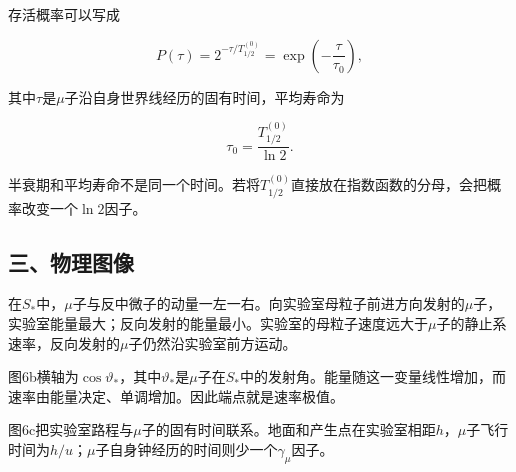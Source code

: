 \documentclass[12pt,a4paper,fontset=fandol]{ctexart}
\begin{document}
存活概率可以写成

\[
P(\tau)=2^{-\tau/T_{1/2}^{(0)}}
=\exp\left(-\frac{\tau}{\tau_0}\right),
\]

其中\(\tau\)是\(\mu\)子沿自身世界线经历的固有时间，平均寿命为

\[
\boxed{\tau_0=\frac{T_{1/2}^{(0)}}{\ln2}}.
\]

半衰期和平均寿命不是同一个时间。若将\(T_{1/2}^{(0)}\)直接放在指数函数的分母，会把概率改变一个\(\ln2\)因子。

\subsection{三、物理图像}\label{ux4e09ux7269ux7406ux56feux50cf-5}

在\(S_*\)中，\(\mu\)子与反中微子的动量一左一右。向实验室母粒子前进方向发射的\(\mu\)子，实验室能量最大；反向发射的能量最小。实验室的母粒子速度远大于\(\mu\)子的静止系速率，反向发射的\(\mu\)子仍然沿实验室前方运动。

\begin{center}
\begin{minipage}{\linewidth}
\centering\begingroup{}
\ifdim\wd\diagrambox>.88\linewidth
\sbox{\diagrambox}{\resizebox{.88\linewidth}{!}{\usebox{\diagrambox}}}\fi
\ifdim\ht\diagrambox>.38\textheight
\resizebox{!}{.38\textheight}{\usebox{\diagrambox}}
\else\usebox{\diagrambox}\fi
\par{}\endgroup\end{minipage}\end{center}

图6b横轴为\(\cos\vartheta_*\)，其中\(\vartheta_*\)是\(\mu\)子在\(S_*\)中的发射角。能量随这一变量线性增加，而速率由能量决定、单调增加。因此端点就是速率极值。

图6c把实验室路程与\(\mu\)子的固有时间联系。地面和产生点在实验室相距\(h\)，\(\mu\)子飞行时间为\(h/u\)；\(\mu\)子自身钟经历的时间则少一个\(\gamma_\mu\)因子。
\end{document}
